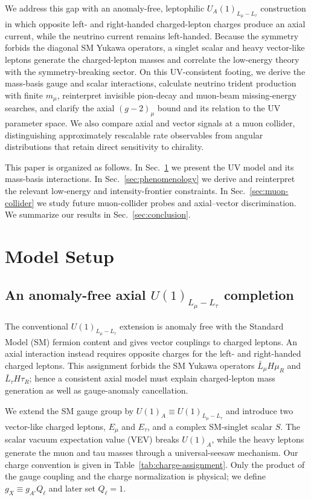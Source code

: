 \documentclass[onecolumn, aps, nofootinbib, prd, preprint, floats, floatfix, amsmath, amssymb, superscriptaddress, preprintnumbers]{revtex4-2}
\begin{document}
We address this gap with an anomaly-free, leptophilic $U_A(1)_{L_\mu-L_\tau}$ construction in which opposite left- and right-handed charged-lepton charges produce an axial current, while the neutrino current remains left-handed. Because the symmetry forbids the diagonal SM Yukawa operators, a singlet scalar and heavy vector-like leptons generate the charged-lepton masses and correlate the low-energy theory with the symmetry-breaking sector. On this UV-consistent footing, we derive the mass-basis gauge and scalar interactions, calculate neutrino trident production with finite $m_\mu$, reinterpret invisible pion-decay and muon-beam missing-energy searches, and clarify the axial $(g-2)_\mu$ bound and its relation to the UV parameter space. We also compare axial and vector signals at a muon collider, distinguishing approximately rescalable rate observables from angular distributions that retain direct sensitivity to chirality.

This paper is organized as follows. In Sec.~\ref{sec:model-setup} we present the UV model and its mass-basis interactions. In Sec.~\ref{sec:phenomenology} we derive and reinterpret the relevant low-energy and intensity-frontier constraints. In Sec.~\ref{sec:muon-collider} we study future muon-collider probes and axial--vector discrimination. We summarize our results in Sec.~\ref{sec:conclusion}.


\section{Model Setup}
\label{sec:model-setup}

\subsection{An anomaly-free axial $U(1)_{L_\mu-L_\tau}$ completion}

The conventional $U(1)_{L_\mu-L_\tau}$ extension is anomaly free with the
Standard Model (SM) fermion content and gives vector couplings to charged
leptons.  An axial interaction instead requires opposite charges for the
left- and right-handed charged leptons.  This assignment forbids the SM
Yukawa operators $\bar L_\mu H\mu_R$ and $\bar L_\tau H\tau_R$; hence a
consistent axial model must explain charged-lepton mass generation as well as
gauge-anomaly cancellation.

We extend the SM gauge group by $U(1)_A\equiv
U(1)_{L_\mu-L_\tau}$ and introduce two vector-like charged leptons,
$E_\mu$ and $E_\tau$, and a complex SM-singlet scalar $S$.  The scalar vacuum
expectation value (VEV) breaks $U(1)_A$, while the heavy leptons generate the
muon and tau masses through a universal-seesaw mechanism.  Our charge
convention is given in Table~\ref{tab:charge-assignment}.  Only the product of
the gauge coupling and the charge normalization is physical; we define
$g_X\equiv g_{A'}Q_\ell$ and later set $Q_\ell=1$.
\end{document}
